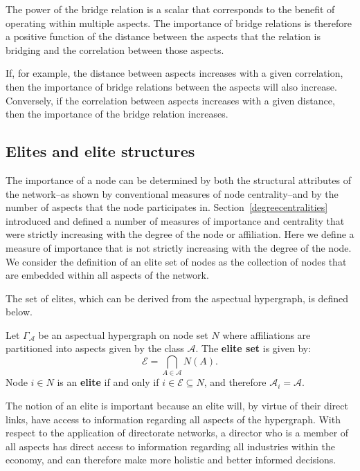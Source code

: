 The power of the bridge relation is a scalar that corresponds to the benefit of operating within multiple aspects. The importance of bridge relations is therefore a positive function of the distance between the aspects that the relation is bridging and the correlation between those aspects.

If, for example, the distance between aspects increases with a given correlation, then the importance of bridge relations between the aspects will also increase. Conversely, if the correlation between aspects increases with a given distance, then the importance of the bridge relation increases.

\subsection{Elites and elite structures}

The importance of a node can be determined by both the structural attributes of the network--as shown by conventional measures of node centrality--and by the number of aspects that the node participates in. Section~\ref{degreecentralities} introduced and defined a number of measures of importance and centrality that were strictly increasing with the degree of the node or affiliation. Here we define a measure of importance that is not strictly increasing with the degree of the node. We consider the definition of an elite set of nodes as the collection of nodes that are embedded within all aspects of the network.

The set of elites, which can be derived from the aspectual hypergraph, is defined below.
\begin{definition}
Let $\Gamma_{\mathcal{A}}$ be an aspectual hypergraph on node set $N$ where affiliations are partitioned into aspects given by the class $\mathcal{A}$. The \textbf{elite set} is given by:
\begin{equation}
\mathcal{E} = \bigcap_{A \in \mathcal{A}} N(A) .
\end{equation}
Node $i \in N$ is an \textbf{elite} if and only if $i \in \mathcal{E} \subseteq N$, and therefore $\mathcal{A}_{i} = \mathcal{A}$.
\end{definition}
The notion of an elite is important because an elite will, by virtue of their direct links, have access to information regarding all aspects of the hypergraph. With respect to the application of directorate networks, a director who is a member of all aspects has direct access to information regarding all industries within the economy, and can therefore make more holistic and better informed decisions.

